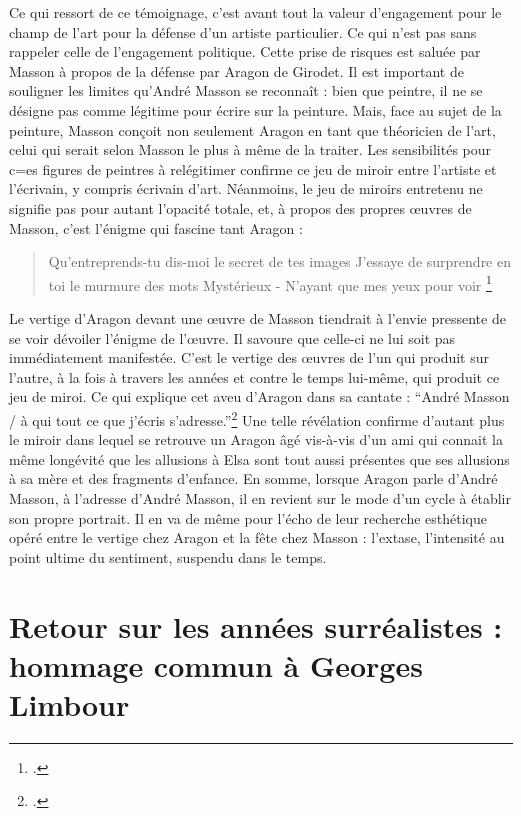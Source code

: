 	Ce qui ressort de ce témoignage, c’est avant tout la valeur d’engagement pour le champ de l’art pour la défense d’un artiste particulier. Ce qui n’est pas sans rappeler celle de l’engagement politique. Cette prise de risques est saluée par Masson à propos de la défense par Aragon de Girodet. Il est important de souligner les limites qu’André Masson se reconnaît : bien que peintre, il ne se désigne pas comme légitime pour écrire sur la peinture. Mais, face au sujet de la peinture, Masson conçoit non seulement Aragon en tant que théoricien de l’art, celui qui serait selon Masson le plus à même de la traiter. Les sensibilités pour c=es figures de peintres à relégitimer confirme ce jeu de miroir entre l’artiste et l’écrivain, y compris écrivain d’art. Néanmoins, le jeu de miroirs entretenu ne signifie pas pour autant l’opacité totale, et, à propos des propres \oe{}uvres de Masson, c’est l’énigme qui fascine tant Aragon :

\begin{verse}
Qu’entreprends-tu dis-moi le secret de tes images
J’essaye de surprendre en toi le murmure des mots
Mystérieux - N’ayant que mes yeux pour voir	
\footcite[p685]{ecritssurla}\end{verse}

	Le vertige d’Aragon devant une \oe{}uvre de Masson tiendrait à l’envie pressente de se voir dévoiler l’énigme de l’\oe{}uvre. Il savoure que celle-ci ne lui soit pas immédiatement manifestée. C’est le vertige des \oe{}uvres de l’un qui produit sur l’autre, à la fois à travers les années et contre le temps lui-même, qui produit ce jeu de miroi. Ce qui explique cet aveu d’Aragon dans sa cantate : \enquote{André Masson / à qui tout ce que j’écris s’adresse.}\footcite[p692]{ecritssurla} Une telle révélation confirme d’autant plus le miroir dans lequel se retrouve un Aragon âgé vis-à-vis d’un ami qui connait la même longévité que les allusions à Elsa sont tout aussi présentes que ses allusions à sa mère et des fragments d’enfance. En somme, lorsque Aragon parle d’André Masson, à l’adresse d’André Masson, il en revient sur le mode d’un cycle à établir son propre portrait. Il en va de même pour l’écho de leur recherche esthétique opéré entre le vertige chez Aragon et la fête chez Masson : l’extase, l’intensité au point ultime du sentiment, suspendu dans le temps. 


\section{Retour sur les années surréalistes : hommage commun à Georges Limbour} 

